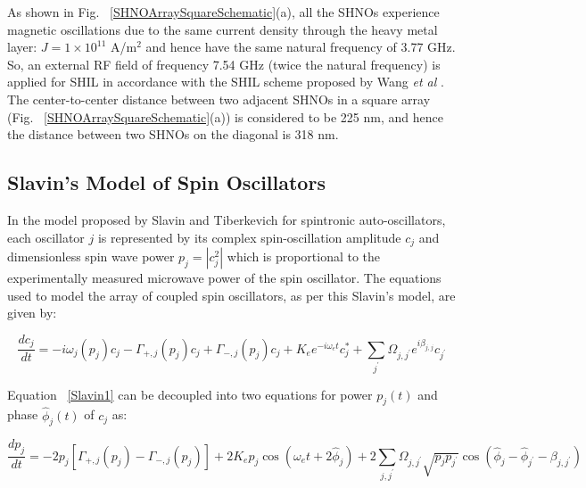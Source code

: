 \documentclass[10pt]{article}
\begin{document}
As shown in Fig. ~\ref{SHNOArraySquareSchematic}(a), all the SHNOs experience magnetic oscillations due to the same current density through the heavy metal layer: $J = 1 \times 10^{11}$ A/m$^2$ and hence have the same natural frequency of 3.77 GHz. So, an external RF field of frequency 7.54 GHz (twice the natural frequency) is applied for SHIL  in accordance with the SHIL scheme proposed by Wang \textit{et al} \cite{Jaijeet1,Jaijeet2}. The center-to-center distance between two adjacent SHNOs in a square array (Fig. ~\ref{SHNOArraySquareSchematic}(a)) is considered to be 225 nm, and hence the distance between two SHNOs on the diagonal is 318 nm.  




\subsection{Slavin's Model of Spin Oscillators}




In the model proposed by Slavin and Tiberkevich \cite{Slavin} for spintronic auto-oscillators, each oscillator $j$ is represented by its complex spin-oscillation amplitude $c_j$ and dimensionless spin wave power $p_j=|c_{j}^2|$ which is proportional to the experimentally measured microwave power of the spin oscillator. The equations used to model the array of coupled spin oscillators, as per this Slavin's model, are given by:


\begin{equation}
    \frac{d c_j}{d t}=-i \omega_j\left(p_j\right) c_j-\Gamma_{+, j}\left(p_j\right) c_j+\Gamma_{-, j}\left(p_j\right) c_j +
    K_e e^{-i \omega_e t} c_j^*+\sum_{j^{\prime}} \Omega_{j, j^{\prime}} e^{i \beta_{j, j}} c_{j^{\prime}}
    \label{Slavin1}
\end{equation}



Equation ~\ref{Slavin1} can be decoupled into two equations for power $p_j(t)$ and phase $\hat{\phi}_j(t)$ of $c_j$ as:



\begin{equation}
    \frac{d p_j}{d t}=-2 p_j\left[\Gamma_{+, j}\left(p_j\right)-\Gamma_{-, j}\left(p_j\right)\right] 
    +2 K_e p_j \cos \left(\omega_e t+ 2 \hat{\phi}_j \right) +  
    2 \sum_{j, j^{\prime}} \Omega_{j, j^{\prime}} \sqrt{p_j p_{j^{\prime}}} \cos \left(\hat{\phi}_j-\hat{\phi}_{j^{\prime}}-\beta_{j, j^{\prime}}\right)
\label{Slavin2}
\end{equation}
\end{document}
